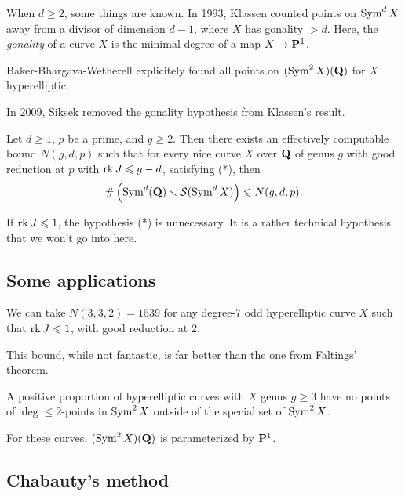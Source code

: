 When $d\geqslant 2$, some things are known. In 1993, Klassen counted points on 
$\operatorname{Sym}^d X$ away from a divisor of dimension $d-1$, where $X$ has gonality 
$>d$. Here, the \emph{gonality} of a curve $X$ is the minimal degree of a map 
$X\to \mathbf{P}^1$. 

Baker-Bhargava-Wetherell explicitely found all points on 
$(\operatorname{Sym}^2 X)(\mathbf{Q})$ for $X$ hyperelliptic. 

In 2009, Siksek removed the gonality hypothesis from Klassen's result. 

\begin{theo}[Park]
Let $d\geqslant 1$, $p$ be a prime, and $g\geqslant 2$. Then there exists an 
effectively computable bound $N(g,d,p)$ such that for every nice curve $X$ over 
$\mathbf{Q}$ of genus $g$ with good reduction at $p$ with $\operatorname{rk} J\leqslant g-d$, 
satisfying (*), then 
\[
  \#\left(\operatorname{Sym}^d(\mathbf{Q})\smallsetminus \mathcal{S}(\operatorname{Sym}^d X)\right) \leqslant N(g,d,p) .
\]
\end{theo}

If $\operatorname{rk} J\leqslant 1$, the hypothesis (*) is unnecessary. It is a rather 
technical hypothesis that we won't go into here. 





\subsection{Some applications}

\begin{prop}[Park]
We can take $N(3,3,2)=1539$ for any degree-$7$ odd hyperelliptic curve $X$ 
such that $\operatorname{rk} J\leqslant 1$, with good reduction at $2$. 
\end{prop}

This bound, while not fantastic, is far better than the one from Faltings' 
theorem. 

\begin{prop}[Park]
A positive proportion of hyperelliptic curves with $X$ genus $g\geqslant 3$ 
have no points of $\deg\leqslant 2$-points in $\operatorname{Sym}^2 X$ outside of the 
special set of $\operatorname{Sym}^2 X$. 
\end{prop}

For these curves, $(\operatorname{Sym}^2 X)(\mathbf{Q})$ is parameterized by $\mathbf{P}^1$. 





\subsection{Chabauty's method}

